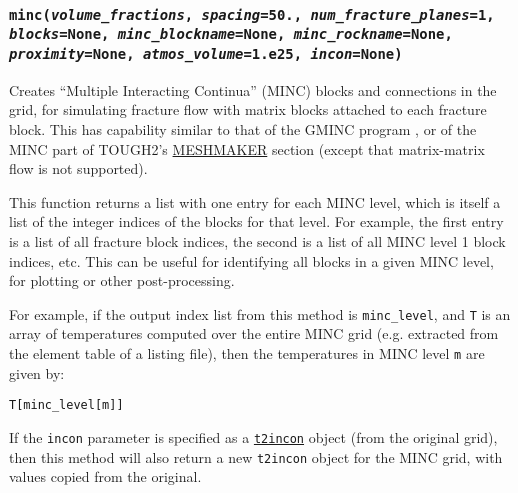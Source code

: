 \begin{snugshade}
\subsubsection{\texttt{minc(\emph{volume\_fractions}, \emph{spacing}=50., \emph{num\_fracture\_planes}=1,\\
    \emph{blocks}=None, \emph{minc\_blockname}=None, \emph{minc\_rockname}=None,\\
    \emph{proximity}=None, \emph{atmos\_volume}=1.e25, \emph{incon}=None)}}
\end{snugshade}
\label{sec:t2grid:MINC}

Creates ``Multiple Interacting Continua'' (MINC) blocks and connections in the grid, for simulating fracture flow with matrix blocks attached to each fracture block. This has capability similar to that of the GMINC program \citep{GMINC}, or of the MINC part of TOUGH2's \hyperref[sec:t2data:meshmaker]{MESHMAKER} section (except that matrix-matrix flow is not supported).

This function returns a list with one entry for each MINC level, which is itself a list of the integer indices of the blocks for that level. For example, the first entry is a list of all fracture block indices, the second is a list of all MINC level 1 block indices, etc. This can be useful for identifying all blocks in a given MINC level, for plotting or other post-processing.

For example, if the output index list from this method is \texttt{minc\_level}, and \texttt{T} is an array of temperatures computed over the entire MINC grid (e.g. extracted from the element table of a listing file), then the temperatures in MINC level \texttt{m} are given by:

\begin{lstlisting}
T[minc_level[m]]
\end{lstlisting}

If the \texttt{incon} parameter is specified as a \hyperref[incons]{\texttt{t2incon}} object (from the original grid), then this method will also return a new \texttt{t2incon} object for the MINC grid, with values copied from the original.

